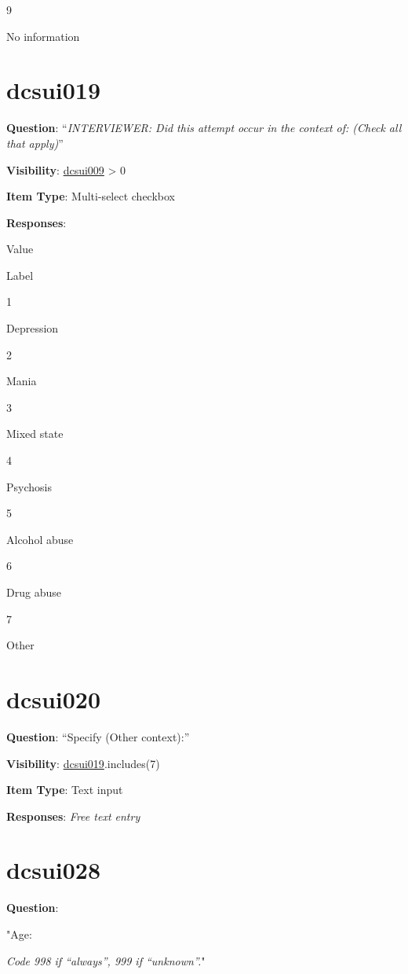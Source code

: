 \documentclass[]{book}
\begin{document}
9

No information

\hypertarget{dcsui019}{%
\section{dcsui019}\label{dcsui019}}

\textbf{Question}: ``\emph{INTERVIEWER: Did this attempt occur in the context of: (Check all that apply)}''

\textbf{Visibility}: \protect\hyperlink{dcsui009}{dcsui009} \textgreater{} 0

\textbf{Item Type}: Multi-select checkbox

\textbf{Responses}:

Value

Label

1

Depression

2

Mania

3

Mixed state

4

Psychosis

5

Alcohol abuse

6

Drug abuse

7

Other

\hypertarget{dcsui020}{%
\section{dcsui020}\label{dcsui020}}

\textbf{Question}: ``Specify (Other context):''

\textbf{Visibility}: \protect\hyperlink{dcsui019}{dcsui019}.includes(7)

\textbf{Item Type}: Text input

\textbf{Responses}: \emph{Free text entry}

\hypertarget{dcsui028}{%
\section{dcsui028}\label{dcsui028}}

\textbf{Question}:

"Age:

\emph{Code 998 if ``always'', 999 if ``unknown''.}"
\end{document}
